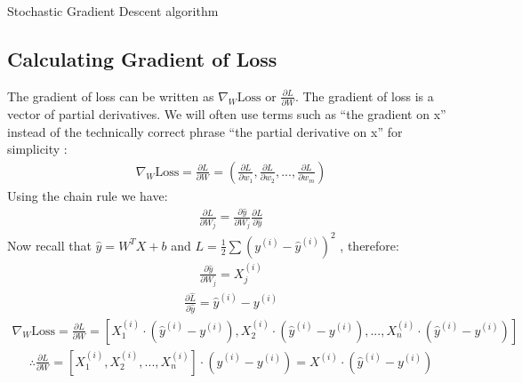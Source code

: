 \documentclass[11pt]{article}
\numberwithin{equation}{section}
\theoremstyle{definition}%
\begin{document}
\begin{algorithm}
    \caption{Stochastic Gradient Descent algorithm}
    \begin{algorithmic}[1]
         
             
                 
                 
                    
                 
            \EndFor
        \EndFor
    \end{algorithmic}
\end{algorithm}

\subsection{Calculating Gradient of Loss}

The gradient of loss can be written as $\nabla_W \text{Loss}$ or  $\frac{\partial L}{\partial W}$. The gradient of loss is a vector of partial derivatives. We will often use terms such as “the gradient on x” instead of the technically correct phrase “the partial derivative on x” for simplicity \cite{Stanford}: 
\begin{align}
    \nabla_W \text{Loss} = \frac{\partial L}{\partial W} = \left( \frac{\partial L}{\partial w_1}, \frac{\partial L}{\partial w_2}, ..., \frac{\partial L}{\partial w_m} \right)
\end{align}
Using the chain rule we have:
\begin{align}
    \frac{\partial L}{\partial W_j} = \frac{\partial \hat{y}}{\partial W_j} \frac{\partial L}{\partial \hat{y}}
\end{align}
Now recall that $\hat{y} = W^{T}X + b$ and $L = \frac{1}{2} \sum{(y^{(i)} - \hat{y}^{(i)})^{2}}$ , therefore:
\begin{align}
    \frac{\partial \hat{y}}{\partial W_j} = X_j^{(i)}
\end{align}
\begin{align}
    \frac{\partial \hat{L}}{\partial \hat{y}} = \hat{y}^{(i)} - y^{(i)}
\end{align}
\begin{align}
    \nabla_W \text{Loss} = \frac{\partial L}{\partial W} = \left[ X_1^{(i)} \cdot (\hat{y}^{(i)}-y^{(i)}), X_2^{(i)} \cdot (\hat{y}^{(i)}-y^{(i)}), ..., X_n^{(i)} \cdot (\hat{y}^{(i)}-y^{(i)}) \right]
\end{align}
\begin{align}
    \therefore \frac{\partial L}{\partial W} = \left[ X_1^{(i)}, X_2^{(i)}, ..., X_n^{(i)} \right] \cdot (\hat{y}^{(i)}-y^{(i)}) = X^{(i)} \cdot (\hat{y}^{(i)}-y^{(i)})
\end{align}
\end{document}
